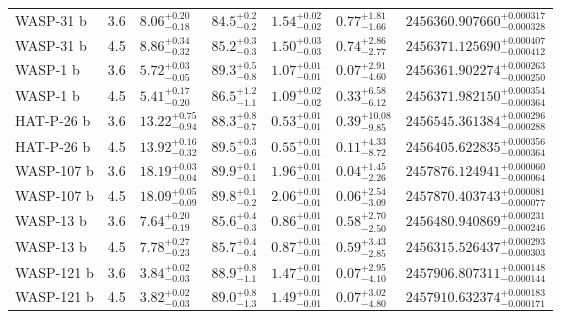 {\begin{longtable}[h]{lllllll}
WASP-31 b   &               3.6 &   ${8.06}^{+0.20}_{-0.18}$ &  ${84.5}^{+0.2}_{-0.2}$ &  ${1.54}^{+0.02}_{-0.02}$ &    ${0.77}^{+1.81}_{-1.66}$ &  ${2456360.907660}^{+0.000317}_{-0.000328}$ \\
WASP-31 b   &               4.5 &   ${8.86}^{+0.34}_{-0.32}$ &  ${85.2}^{+0.3}_{-0.3}$ &  ${1.50}^{+0.03}_{-0.03}$ &    ${0.74}^{+2.86}_{-2.77}$ &  ${2456371.125690}^{+0.000407}_{-0.000412}$ \\
WASP-1 b    &               3.6 &   ${5.72}^{+0.03}_{-0.05}$ &  ${89.3}^{+0.5}_{-0.8}$ &  ${1.07}^{+0.01}_{-0.01}$ &    ${0.07}^{+2.91}_{-4.60}$ &  ${2456361.902274}^{+0.000263}_{-0.000250}$ \\
WASP-1 b    &               4.5 &   ${5.41}^{+0.17}_{-0.20}$ &  ${86.5}^{+1.2}_{-1.1}$ &  ${1.09}^{+0.02}_{-0.02}$ &    ${0.33}^{+6.58}_{-6.12}$ &  ${2456371.982150}^{+0.000354}_{-0.000364}$ \\
HAT-P-26 b   &               3.6 &  ${13.22}^{+0.75}_{-0.94}$ &  ${88.3}^{+0.8}_{-0.7}$ &  ${0.53}^{+0.01}_{-0.01}$ &   ${0.39}^{+10.08}_{-9.85}$ &  ${2456545.361384}^{+0.000296}_{-0.000288}$ \\
HAT-P-26 b   &               4.5 &  ${13.92}^{+0.16}_{-0.32}$ &  ${89.5}^{+0.3}_{-0.6}$ &  ${0.55}^{+0.01}_{-0.01}$ &    ${0.11}^{+4.33}_{-8.72}$ &  ${2456405.622835}^{+0.000356}_{-0.000364}$ \\
WASP-107 b  &               3.6 &  ${18.19}^{+0.03}_{-0.04}$ &  ${89.9}^{+0.1}_{-0.1}$ &  ${1.96}^{+0.01}_{-0.01}$ &    ${0.04}^{+1.45}_{-2.26}$ &  ${2457876.124941}^{+0.000060}_{-0.000064}$ \\
WASP-107 b  &               4.5 &  ${18.09}^{+0.05}_{-0.09}$ &  ${89.8}^{+0.1}_{-0.2}$ &  ${2.06}^{+0.01}_{-0.01}$ &    ${0.06}^{+2.54}_{-3.09}$ &  ${2457870.403743}^{+0.000081}_{-0.000077}$ \\
WASP-13 b   &               3.6 &   ${7.64}^{+0.20}_{-0.19}$ &  ${85.6}^{+0.4}_{-0.3}$ &  ${0.86}^{+0.01}_{-0.01}$ &    ${0.58}^{+2.70}_{-2.50}$ &  ${2456480.940869}^{+0.000231}_{-0.000246}$ \\
WASP-13 b   &               4.5 &   ${7.78}^{+0.27}_{-0.23}$ &  ${85.7}^{+0.4}_{-0.4}$ &  ${0.87}^{+0.01}_{-0.01}$ &    ${0.59}^{+3.43}_{-2.85}$ &  ${2456315.526437}^{+0.000293}_{-0.000303}$ \\
WASP-121 b  &               3.6 &   ${3.84}^{+0.02}_{-0.03}$ &  ${88.9}^{+0.8}_{-1.1}$ &  ${1.47}^{+0.01}_{-0.01}$ &    ${0.07}^{+2.95}_{-4.10}$ &  ${2457906.807311}^{+0.000148}_{-0.000144}$ \\
WASP-121 b  &               4.5 &   ${3.82}^{+0.02}_{-0.03}$ &  ${89.0}^{+0.8}_{-1.3}$ &  ${1.49}^{+0.01}_{-0.01}$ &    ${0.07}^{+3.02}_{-4.80}$ &  ${2457910.632374}^{+0.000183}_{-0.000171}$ \\

\end{longtable}}
